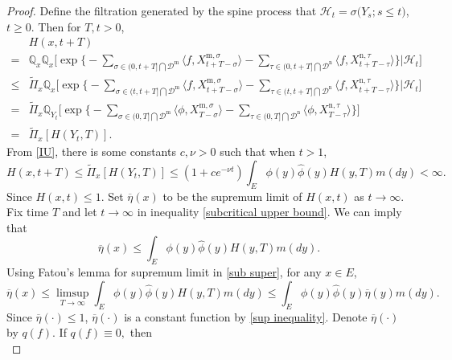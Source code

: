 \documentclass[12pt,a4paper]{amsart}
\numberwithin{equation}{section}
\theoremstyle{plain}
\theoremstyle{definition}
\theoremstyle{remark}
\begin{document}
\begin{proof}
Define the filtration generated by the spine process that $\mathcal{H}_t=\sigma\big(Y_s; s\leq t\big)$, $t\geq 0$.  Then for $T,t>0$,
\begin{equation}\label{subcritical upper bound}
 \begin{aligned}
 &H(x,t+T)\\
 =&\mathbb Q_{x}\mathbb Q_{x}\Big[\exp\Big\{-\sum_{\sigma\in (0, t+T]\bigcap \mathcal D^{\mathrm m}}\langle f, X_{t+T-\sigma}^{{\mathrm m},\sigma}\rangle -\sum_{\tau\in (0, t+T]\bigcap \mathcal D^{\mathrm n}}\langle f, X_{t+T-\tau}^{{\mathrm n}, \tau}\rangle \Big\}\Big| \mathcal H_t\Big]\\
 \leq&\widetilde\Pi_x\mathbb Q_{x}\Big[\exp\Big\{-\sum_{\sigma\in (t, t+T]\bigcap \mathcal D^{\mathrm m}}\langle f, X_{t+T-\sigma}^{{\mathrm m},\sigma}\rangle -\sum_{\tau\in (t, t+T]\bigcap \mathcal D^{\mathrm n}}\langle f, X_{t+T-\tau}^{{\mathrm n}, \tau}\rangle \Big\}\Big| \mathcal H_t\Big]\\
 =&
  \widetilde\Pi_x\mathbb Q_{Y_t}\Big[\exp\Big\{-\sum_{\sigma\in (0, T]\bigcap \mathcal D^{\mathrm m}}\langle \phi, X_{T-\sigma}^{{\mathrm m},\sigma}\rangle -\sum_{\tau\in (0, T]\bigcap \mathcal D^{\mathrm n}}\langle \phi, X_{T-\tau}^{{\mathrm n}, \tau}\rangle \Big\}\Big]\\
 =&\widetilde\Pi_x\left[ H(Y_t, T)\right].
 \end{aligned}
 \end{equation}
 From \eqref{IU}, there is some constants $c,\nu>0$ such that when $t>1$,
\[
 H(x,t+T)\leq \widetilde\Pi_x\left[ H(Y_t, T)\right]\leq (1+ce^{-\nu t})\int_E\phi(y)\hat\phi(y)H(y,T)m(dy)<\infty.
 \]
Since $H(x,t)\leq 1$.  Set $\overline \eta(x)$ to be the supremum limit of $H(x,t)$ as $t\to \infty$.
Fix time $T$ and let $t\to \infty$ in inequality \eqref{subcritical upper bound}. We can imply that
\begin{equation}\label{sub super}
\overline\eta(x)\leq \int_E\phi(y)\hat \phi(y)H(y,T)m(dy).
\end{equation}
   Using Fatou's lemma for supremum limit
in \eqref{sub super}, for any $x\in E$,
\begin{equation}\label{sup inequality}
\overline\eta(x)\leq \limsup_{T\rightarrow\infty}\int_E\phi(y)\hat \phi(y)H(y,T)m(dy)\leq \int_E\phi(y)\hat\phi(y)\overline{\eta}(y)m(dy).
\end{equation}
 Since $\overline{\eta}(\cdot)\leq 1$, $\overline\eta(\cdot)$ is a constant function by \eqref{sup inequality}.
 Denote $\overline\eta(\cdot)$ by $q(f)$.  If $q(f)\equiv 0,$ then
 \begin{equation}\label{limit}

\end{equation}
\end{proof}
\end{document}
